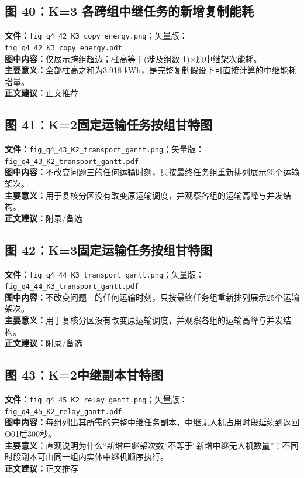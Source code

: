 \subsection*{图 40：K=3 各跨组中继任务的新增复制能耗}
\textbf{文件：}\texttt{fig\_q4\_42\_K3\_copy\_energy.png}；矢量版：\texttt{fig\_q4\_42\_K3\_copy\_energy.pdf}\\
\textbf{图中内容：}仅展示跨组超边；柱高等于(涉及组数-1)×原中继架次能耗。\\
\textbf{主要意义：}全部柱高之和为3.918 kWh，是完整复制假设下可直接计算的中继能耗增量。\\
\textbf{正文建议：}正文推荐

\subsection*{图 41：K=2固定运输任务按组甘特图}
\textbf{文件：}\texttt{fig\_q4\_43\_K2\_transport\_gantt.png}；矢量版：\texttt{fig\_q4\_43\_K2\_transport\_gantt.pdf}\\
\textbf{图中内容：}不改变问题三的任何运输时刻，只按最终任务组重新排列展示25个运输架次。\\
\textbf{主要意义：}用于复核分区没有改变原运输调度，并观察各组的运输高峰与并发结构。\\
\textbf{正文建议：}附录/备选

\subsection*{图 42：K=3固定运输任务按组甘特图}
\textbf{文件：}\texttt{fig\_q4\_44\_K3\_transport\_gantt.png}；矢量版：\texttt{fig\_q4\_44\_K3\_transport\_gantt.pdf}\\
\textbf{图中内容：}不改变问题三的任何运输时刻，只按最终任务组重新排列展示25个运输架次。\\
\textbf{主要意义：}用于复核分区没有改变原运输调度，并观察各组的运输高峰与并发结构。\\
\textbf{正文建议：}附录/备选

\subsection*{图 43：K=2中继副本甘特图}
\textbf{文件：}\texttt{fig\_q4\_45\_K2\_relay\_gantt.png}；矢量版：\texttt{fig\_q4\_45\_K2\_relay\_gantt.pdf}\\
\textbf{图中内容：}每组列出其所需的完整中继任务副本，中继无人机占用时段延续到返回O01后300秒。\\
\textbf{主要意义：}直观说明为什么“新增中继架次数”不等于“新增中继无人机数量”：不同时段副本可由同一组内实体中继机顺序执行。\\
\textbf{正文建议：}正文推荐

